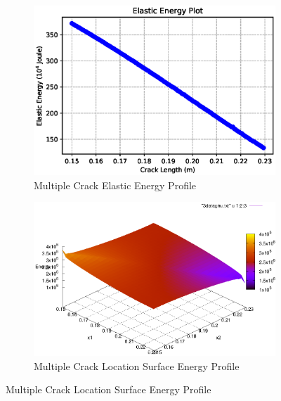 \documentclass[a4paper,11pt]{article}
\begin{document}
\begin{figure}[h!]
	\begin{subfigure}[b]{0.49\linewidth}
	\centering
\includegraphics[width=\linewidth]{picture/conference/multicrack-elastic}
\caption{Multiple Crack Elastic Energy Profile}
\label{fig:multicrack-elastic}
	\end{subfigure}
	\begin{subfigure}[b]{0.49\linewidth}
	\centering
	\includegraphics[width=\linewidth]{picture/conference/multicrack-2d}
	\caption{Multiple Crack Location Surface Energy Profile}
	\label{fig:multicrack-2d}
\end{subfigure}
\end{figure}
\end{document}
